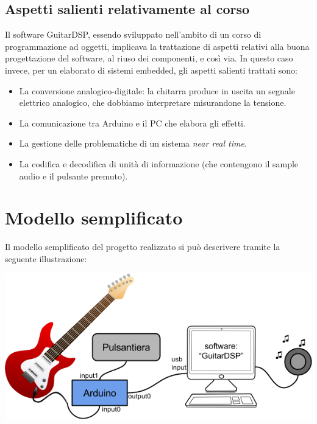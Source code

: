 \documentclass[a4paper,11pt]{article}
\begin{document}
\subsection{Aspetti salienti relativamente al corso}

Il software GuitarDSP, essendo sviluppato nell'ambito di un corso di programmazione ad oggetti, implicava la trattazione di aspetti relativi alla buona progettazione del software, al riuso dei componenti, e così via. In questo caso invece, per un elaborato di sistemi embedded, gli aspetti salienti trattati sono:
\begin{itemize}
\item La conversione analogico-digitale: la chitarra produce in uscita un segnale elettrico analogico, che dobbiamo interpretare misurandone la tensione.
\item La comunicazione tra Arduino e il PC che elabora gli effetti.
\item La gestione delle problematiche di un sistema \textit{near real time}.
\item La codifica e decodifica di unità di informazione (che contengono il sample audio e il pulsante premuto).
\end{itemize}


\section{Modello semplificato}

Il modello semplificato del progetto realizzato si può descrivere tramite la seguente illustrazione:

\begin{center}
    \includegraphics[width=0.9\linewidth]{fig1.png}
\end{center}
\end{document}
